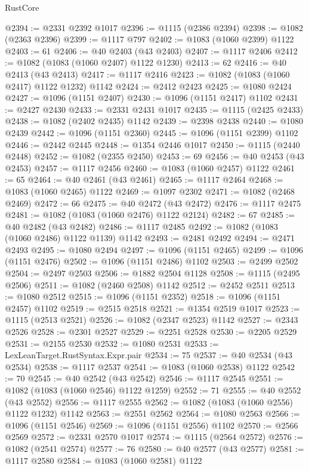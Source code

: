 \begin{lexlean}{RustCore}
\begin{coremodule}
@2394 := @2331 @2392 @1017
@2396 := @1115 (@2386 @2394)
@2398 := @1082 (@2363 @2396)
@2399 := @1117 @797
@2402 := @1083 (@1060 @2399) @1122
@2403 := 61
@2406 := @40 @2403 (@43 @2403)
@2407 := @1117 @2406
@2412 := @1082 (@1083 (@1060 @2407) @1122 @1230)
@2413 := 62
@2416 := @40 @2413 (@43 @2413)
@2417 := @1117 @2416
@2423 := @1082 (@1083 (@1060 @2417) @1122 @1232) @1142
@2424 := @2412 @2423
@2425 := @1080 @2424
@2427 := @1096 (@1151 @2407)
@2430 := @1096 (@1151 @2417) @1102
@2431 := @2427 @2430
@2433 := @2331 @2431 @1017
@2435 := @1115 (@2425 @2433)
@2438 := @1082 (@2402 @2435) @1142
@2439 := @2398 @2438
@2440 := @1080 @2439
@2442 := @1096 (@1151 @2360)
@2445 := @1096 (@1151 @2399) @1102
@2446 := @2442 @2445
@2448 := @1354 @2446 @1017
@2450 := @1115 (@2440 @2448)
@2452 := @1082 (@2355 @2450)
@2453 := 69
@2456 := @40 @2453 (@43 @2453)
@2457 := @1117 @2456
@2460 := @1083 (@1060 @2457) @1122
@2461 := 65
@2464 := @40 @2461 (@43 @2461)
@2465 := @1117 @2464
@2468 := @1083 (@1060 @2465) @1122
@2469 := @1097 @2302
@2471 := @1082 (@2468 @2469)
@2472 := 66
@2475 := @40 @2472 (@43 @2472)
@2476 := @1117 @2475
@2481 := @1082 (@1083 (@1060 @2476) @1122 @2124)
@2482 := 67
@2485 := @40 @2482 (@43 @2482)
@2486 := @1117 @2485
@2492 := @1082 (@1083 (@1060 @2486) @1122 @1139) @1142
@2493 := @2481 @2492
@2494 := @2471 @2493
@2495 := @1080 @2494
@2497 := @1096 (@1151 @2465)
@2499 := @1096 (@1151 @2476)
@2502 := @1096 (@1151 @2486) @1102
@2503 := @2499 @2502
@2504 := @2497 @2503
@2506 := @1882 @2504 @1128
@2508 := @1115 (@2495 @2506)
@2511 := @1082 (@2460 @2508) @1142
@2512 := @2452 @2511
@2513 := @1080 @2512
@2515 := @1096 (@1151 @2352)
@2518 := @1096 (@1151 @2457) @1102
@2519 := @2515 @2518
@2521 := @1354 @2519 @1017
@2523 := @1115 (@2513 @2521)
@2526 := @1082 (@2347 @2523) @1142
@2527 := @2343 @2526
@2528 := @2301 @2527
@2529 := @2251 @2528
@2530 := @2205 @2529
@2531 := @2155 @2530
@2532 := @1080 @2531
@2533 := LexLeanTarget.RustSyntax.Expr.pair
@2534 := 75
@2537 := @40 @2534 (@43 @2534)
@2538 := @1117 @2537
@2541 := @1083 (@1060 @2538) @1122
@2542 := 70
@2545 := @40 @2542 (@43 @2542)
@2546 := @1117 @2545
@2551 := @1082 (@1083 (@1060 @2546) @1122 @1259)
@2552 := 71
@2555 := @40 @2552 (@43 @2552)
@2556 := @1117 @2555
@2562 := @1082 (@1083 (@1060 @2556) @1122 @1232) @1142
@2563 := @2551 @2562
@2564 := @1080 @2563
@2566 := @1096 (@1151 @2546)
@2569 := @1096 (@1151 @2556) @1102
@2570 := @2566 @2569
@2572 := @2331 @2570 @1017
@2574 := @1115 (@2564 @2572)
@2576 := @1082 (@2541 @2574)
@2577 := 76
@2580 := @40 @2577 (@43 @2577)
@2581 := @1117 @2580
@2584 := @1083 (@1060 @2581) @1122

\end{coremodule}
\end{lexlean}
